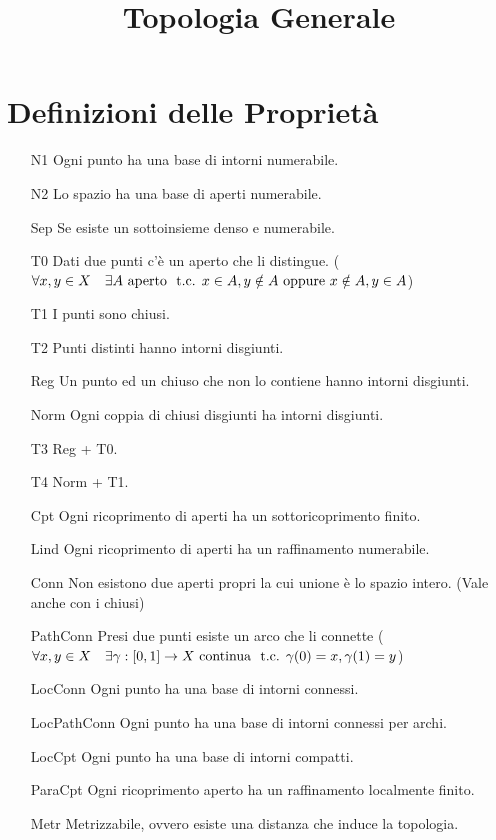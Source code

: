 \documentclass[a4paper,NoNotes,GeneralMath]{stdmdoc}
\newcommand{\aperto}{\text{ aperto }}
\newcommand{\continua}{\text{ continua }}
\begin{document}
	\title{Topologia Generale}
	
	\section*{Definizioni delle Proprietà}
	\begin{itemize}
		\item[N1] Ogni punto ha una base di intorni numerabile.
		\item[N2] Lo spazio ha una base di aperti numerabile.
		\item[Sep] Se esiste un sottoinsieme denso e numerabile.
		\item[T0] Dati due punti c'è un aperto che li distingue. ($\forall x, y \in X \quad \exists A \aperto \tc x \in A, y \notin A \opp x \notin A, y \in A$)
		\item[T1] I punti sono chiusi.
		\item[T2] Punti distinti hanno intorni disgiunti.
		\item[Reg] Un punto ed un chiuso che non lo contiene hanno intorni disgiunti.
		\item[Norm] Ogni coppia di chiusi disgiunti ha intorni disgiunti.
		\item[T3] Reg + T0.
		\item[T4] Norm + T1.
		\item[Cpt] Ogni ricoprimento di aperti ha un sottoricoprimento finito.
		\item[Lind] Ogni ricoprimento di aperti ha un raffinamento numerabile.
		\item[Conn] Non esistono due aperti propri la cui unione è lo spazio intero. (Vale anche con i chiusi)
		\item[PathConn] Presi due punti esiste un arco che li connette ($\forall x, y \in X \quad \exists \gamma: [0,1] \rar X \continua \tc \gamma(0) = x, \gamma(1) = y$)
		\item[LocConn] Ogni punto ha una base di intorni connessi.
		\item[LocPathConn] Ogni punto ha una base di intorni connessi per archi.
		\item[LocCpt] Ogni punto ha una base di intorni compatti.
		\item[ParaCpt] Ogni ricoprimento aperto ha un raffinamento localmente finito.
		\item[Metr] Metrizzabile, ovvero esiste una distanza che induce la topologia.
	\end{itemize} \vskip 0.5cm
\end{document}
